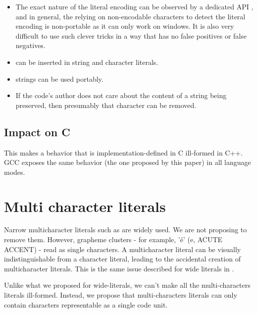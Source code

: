 \documentclass{wg21}
\begin{document}
    \begin{itemize}
        \item The exact nature of the literal encoding can be observed by a dedicated API , and in general, the relying on non-encodable characters to detect the literal encoding
        is non-portable as it can only work on windows. It is also very difficult to use such clever tricks in a way that has no false positives or false negatives.
        \item {} can be inserted in string and character literals.
        \item {} strings can be used portably.
        \item If the code's author does not care about the content of a string being preserved, then presumably that character can be removed.
    \end{itemize}

    \subsection{Impact on C}

    This makes a behavior that is implementation-defined in C ill-formed in C++.
    GCC exposes the same behavior (the one proposed by this paper) in all language modes.

    \section{Multi character literals}

    Narrow multicharacter literals such as  are widely used. We are not proposing to remove them.
    However, grapheme clusters - for example, 'é' (e, ACUTE ACCENT) - read as single characters.
    A multicharacter literal can be visually indistinguishable from a character literal, leading to the accidental creation of multicharacter literals.
    This is the same issue described for wide literals in .

    Unlike what we proposed for wide-literals, we can't make all the multi-characters literals ill-formed.
    Instead, we propose that multi-characters literals can only contain characters representable as a single code unit.
\end{document}
